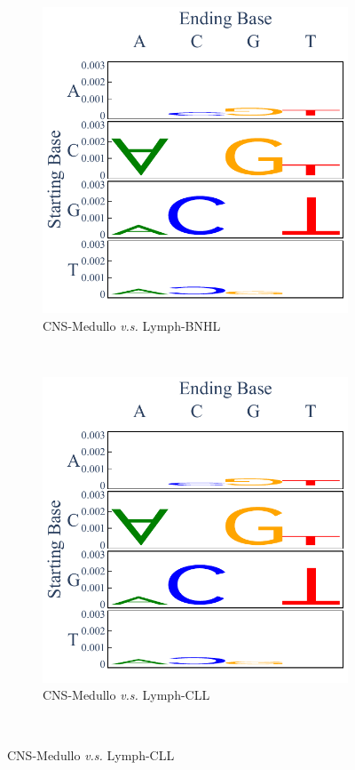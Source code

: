 \begin{figure}[ht!]
    \begin{subfigure}{.5\textwidth}
    \includegraphics[scale=0.7]{graphics/spectra_CNS-Medullo_Lymph-BNHL.pdf}
    \caption{CNS-Medullo \textit{v.s.} Lymph-BNHL}
    \label{fig:spectra_medullo_bnhl}
    \end{subfigure}
    ~
    \begin{subfigure}{.5\textwidth}
    \includegraphics[scale=0.7]{graphics/spectra_CNS-Medullo_Lymph-CLL.pdf}
    \caption{CNS-Medullo \textit{v.s.} Lymph-CLL}
    \label{fig:spectra_medullo_cll}
    \end{subfigure} \\
    \vspace{0.5cm}
    

\end{figure}
